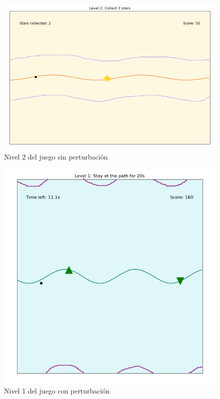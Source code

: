\begin{figure}[ht!]
	\centering
	\begin{minipage}{0.85\linewidth}
		\centering
		\includegraphics[width=\linewidth]{figs/flappy_level.png}
	\end{minipage}
	\caption[Nivel 2 del juego sin perturbación]{Nivel 2 del juego sin perturbación}
	\label{fig:level}
\end{figure}

\begin{figure}[ht!]
	\centering
	\begin{minipage}{0.70\linewidth}
		\centering
		\includegraphics[width=\linewidth]{figs/flappy_level2.png}
	\end{minipage}
	\caption[Nivel 1 del juego con perturbación]{Nivel 1 del juego con perturbación}
	\label{fig:level2}
\end{figure}

